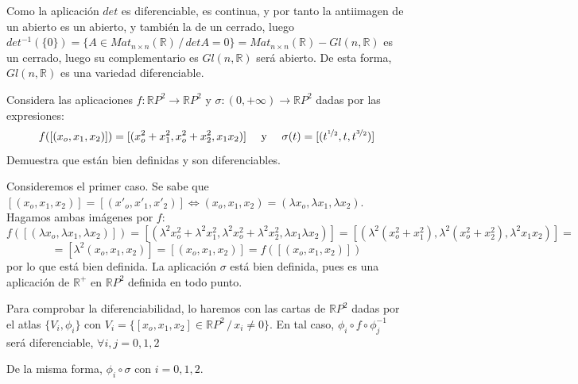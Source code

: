 \begin{sol}
\begin{itemize}
        Como la aplicaci\'on $det$ es diferenciable, es continua, y por tanto la antiimagen de un abierto es un abierto, y tambi\'en la de un cerrado, luego $det^{-1}(\{0\}) = \{A \in Mat_{n\times n}(\mathbb R) \, / \, det A = 0 \} =Mat_{n \times n}(\mathbb R) - Gl(n, \mathbb R)$ es un cerrado, luego su complementario es $Gl(n, \mathbb R)$ ser\'a abierto. De esta forma, $Gl(n, \mathbb R)$ es una variedad diferenciable.
    \end{itemize}
\end{sol}
\begin{ejer}
    [3] Considera las aplicaciones $f : \mathbb RP^2 \to \mathbb RP^2$ y $\sigma : (0, +\infty) \to \mathbb RP^2$ dadas por las
    expresiones:
    $$f([(x_o,x_1,x_2)]) = [(x_o^2+x_1^2, x_o^2+x_2^2,x_1x_2)] \quad \text{ y } \quad \sigma(t) = [(t^{\nicefrac{1}{2}}, t , t^{\nicefrac{3}{2}})]$$
    Demuestra que est\'an bien definidas y son diferenciables.
\end{ejer}
\begin{sol}
    Consideremos el primer caso. Se sabe que $[(x_o,x_1,x_2)] = [(x'_o,x'_1,x'_2)] \iff (x_o,x_1,x_2)=(\lambda x_o,\lambda x_1,\lambda x_2)$.  Hagamos ambas im\'agenes por $f$:
    $$f([(\lambda x_o,\lambda x_1,\lambda x_2)]) = [(\lambda^2 x_o^2 + \lambda ^2 x_1^2, \lambda^2 x_o^2 + \lambda ^2 x_2^2, \lambda x_1 \lambda x_2)] = [(\lambda^2 (x_o^2 + x_1^2), \lambda^2 (x_o^2 + x_2^2), \lambda^2 x_1 x_2)] = $$
    $$= [\lambda^2(x_o,x_1,x_2)]=[(x_o,x_1,x_2)]=f([(x_o,x_1,x_2)])$$
    por lo que está bien definida. La aplicaci\'on $\sigma$ est\'a bien definida, pues es una aplicaci\'on de $\mathbb R^+$ en $\mathbb RP^2$ definida en todo punto.

    Para comprobar la diferenciabilidad, lo haremos con las cartas de $\mathbb RP^2$ dadas por el atlas $\{V_i, \phi_i\}$ con $V_i = \{[x_o,x_1,x_2] \in \mathbb RP^2\, /\, x_i \neq 0\}$. En tal caso, $\phi_i \circ f \circ \phi_j^{-1}$ ser\'a diferenciable, $\forall i,j = 0,1,2$

    De la misma forma, $\phi_i \circ \sigma $ con $ i = 0,1,2$.  
\end{sol}
